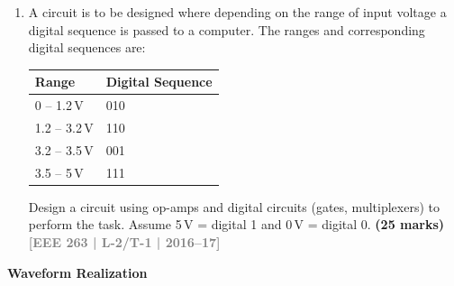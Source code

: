 \documentclass[12pt,a3paper]{article}
\newcommand{\yr}[1]{\hfill\textcolor{gray}{\small\textbf{[#1]}}}
\newcommand{\mk}[1]{\textcolor{orange!70!black}{\small\textbf{(#1 marks)}}}
\newcommand{\subtopic}[2]{%
  \vspace{10pt}
  \noindent\begin{tcolorbox}[colback=#1!8,colframe=#1,boxrule=0.6pt,arc=4pt,
    left=6pt,right=6pt,top=4pt,bottom=4pt]
    \small\bfseries\textcolor{#1}{#2}
  \end{tcolorbox}
  \vspace{2pt}
}
\begin{document}
\begin{enumerate}
\begin{center}
    
\end{center}

\mk{26.67} \yr{EEE 263 | L-2/T-1 | 2017--18}

\item A circuit is to be designed where depending on the range of input voltage a digital sequence is passed to a computer. The ranges and corresponding digital sequences are:
\begin{center}
\begin{tabular}{ll}
\toprule
\textbf{Range} & \textbf{Digital Sequence} \\
\midrule
0 -- 1.2\,V & 010 \\
1.2 -- 3.2\,V & 110 \\
3.2 -- 3.5\,V & 001 \\
3.5 -- 5\,V & 111 \\
\bottomrule
\end{tabular}
\end{center}
Design a circuit using op-amps and digital circuits (gates, multiplexers) to perform the task. Assume 5\,V = digital 1 and 0\,V = digital 0.
\mk{25} \yr{EEE 263 | L-2/T-1 | 2016--17}

\end{enumerate}

\subtopic{cE}{Waveform Realization}
\label{sub:s7-wavereal}
\end{document}
